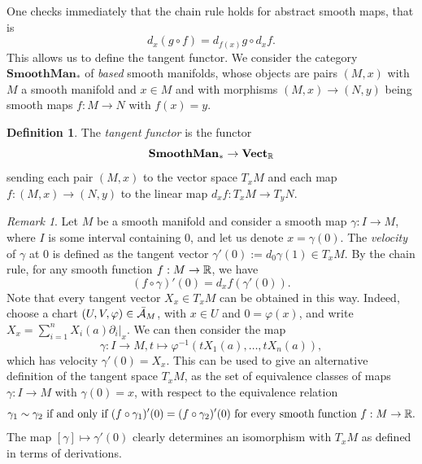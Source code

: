 \documentclass[11pt,a4paper]{book}
\theoremstyle{remark} \newtheorem{rmk}[thm]{Remark}
\theoremstyle{definition} \newtheorem{defn}[thm]{Definition}
\theoremstyle{definition} \newtheorem{ex}[thm]{Example}
\theoremstyle{definition} \newtheorem{ej}[thm]{Exercise}
\begin{document}
One checks immediately that the chain rule holds for abstract smooth maps, that is
\begin{equation*}
d_x(g\circ f) = d_{f(x)} g \circ d_x f.
\end{equation*}
This allows us to define the tangent functor. We consider the category $\mathbf{SmoothMan}_*$ of \emph{based} smooth manifolds, whose objects are pairs $(M,x)$ with $M$ a smooth manifold and $x\in M$ and with morphisms $(M,x)\rightarrow (N,y)$ being smooth maps $f:M\rightarrow N$ with $f(x)=y$.

\begin{defn}
  The \emph{tangent functor} is the functor
  \begin{equation*}
\mathbf{SmoothMan}_* \rightarrow \mathbf{Vect}_{\mathbb R}
  \end{equation*}
sending each pair $(M,x)$ to the vector space $T_xM$ and each map $f:(M,x)\rightarrow (N,y)$ to the linear map $d_xf:T_xM\rightarrow T_y N$.
\end{defn}

\begin{rmk}
  Let $M$ be a smooth manifold and consider a smooth map $\gamma:I\rightarrow M$, where $I$ is some interval containing $0$, and let us denote $x=\gamma(0)$. The \emph{velocity} of $\gamma$ at $0$ is defined as the tangent vector $\gamma'(0):= d_0\gamma(1) \in T_x M$. By the chain rule, for any smooth function $f:M\rightarrow \mathbb R$, we have
  \begin{equation*}
(f \circ \gamma)'(0) = d_x f (\gamma'(0)).
  \end{equation*}
Note that every tangent vector $X_x \in T_xM$ can be obtained in this way. Indeed, choose a chart $(U,V,\varphi)\in \bar{\mathcal A}_M$, with $x\in U$ and $0=\varphi(x)$, and write $X_x=\sum_{i=1}^n X_i(a) \partial_i|_x$. We can then consider the map
\begin{equation*}
\gamma:I \longrightarrow M, t \longmapsto  \varphi^{-1}(tX_1(a),\dots,tX_n(a)),
\end{equation*}
which has velocity $\gamma'(0)=X_x$. This can be used to give an alternative definition of the tangent space $T_xM$, as the set of equivalence classes of maps $\gamma:I\rightarrow M$ with $\gamma(0)=x$, with respect to the equivalence relation
\begin{equation*}
\gamma_1 \sim \gamma_2 \text{ if and only if } (f\circ \gamma_1)'(0) = (f \circ \gamma_2)'(0) \text{ for every smooth function } f:M\rightarrow \mathbb R.
\end{equation*}
The map $[\gamma]\mapsto \gamma'(0)$ clearly determines an isomorphism with $T_xM$ as defined in terms of derivations.
\end{rmk}
\end{document}
